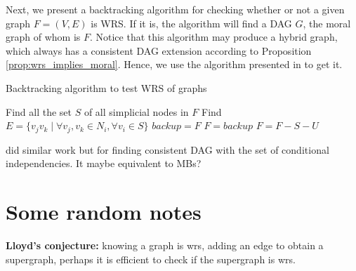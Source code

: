Next, we present a backtracking algorithm for checking whether or not a given graph $F=(V,E)$ is WRS. If it is, the algorithm will find a DAG $G$, the moral graph of whom is $F$. Notice that this algorithm may produce a hybrid graph, which always has a consistent DAG extension according to Proposition \ref{prop:wrs_implies_moral}. Hence, we use the algorithm presented in \cite{dor1992simple} to get it. 
\begin{algorithm}[]
\caption{Backtracking algorithm to test WRS of graphs}
\label{alg:wrs_bktr}
\begin{algorithmic}[]
    \Statex
    \EndIf
    \State Find all the set $S$ of all simplicial nodes in $F$
    	\State Find $E=\{v_jv_k \mid \forall v_j, v_k \in N_i, \forall v_i \in S\}$
    	\State $backup = F$
    	 
    	\State $F=backup$
    	\State $F=F-S-U$ 
        \EndIf
      \EndFor
    \EndIf
    \State {}
    \EndFunction
\end{algorithmic}
\end{algorithm}

\cite{verma1992algorithm} did similar work but for finding consistent DAG with the set of conditional independencies. It maybe equivalent to MBs?

\section{Some random notes}

\textbf{Lloyd's conjecture:} knowing a graph is wrs, adding an edge to obtain a supergraph, perhaps it is efficient to check if the supergraph is wrs.

